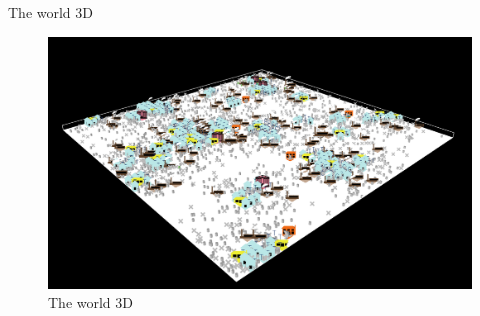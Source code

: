 \documentclass[9pt]{beamer}
\begin{document}











\begin{frame}{The world 3D}

\begin{figure}[H]
\center
\includegraphics[scale=0.55]{world3D.png}

\caption{The world 3D} 
\label{world3D}
\end{figure}

\end{frame}
\end{document}
